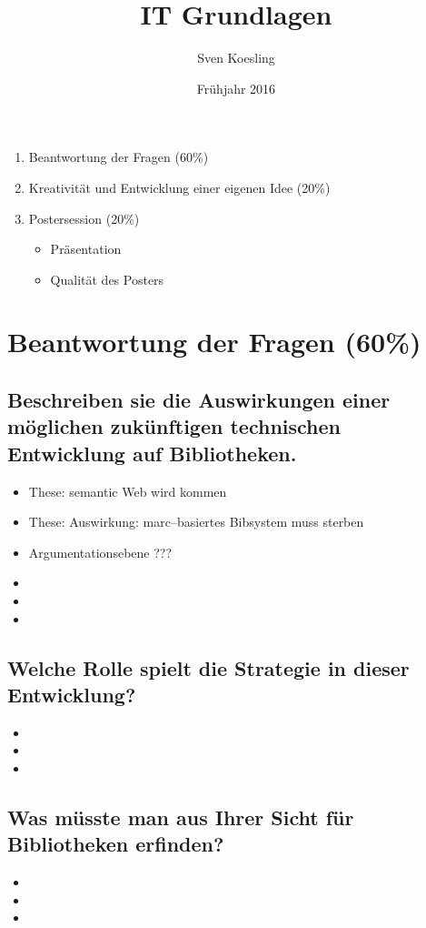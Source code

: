 \documentclass[german,headsepline]{scrartcl}
\title{IT Grundlagen}
\author{Sven Koesling}
\date{Frühjahr 2016}
\begin{document}
\begin{enumerate}
  \item Beantwortung der Fragen (60\%)
  \item Kreativität und Entwicklung einer eigenen Idee (20\%)
  \item Postersession (20\%)
  \begin{itemize}
    \item Präsentation
    \item Qualität des Posters
  \end{itemize}
\end{enumerate}
  
\section{Beantwortung der Fragen (60\%)}
\subsection{Beschreiben sie die Auswirkungen einer möglichen zukünftigen technischen Entwicklung auf Bibliotheken.}
\begin{itemize}
  \item These: semantic Web wird kommen
  \item These: Auswirkung: marc--basiertes Bibsystem muss sterben
  \item Argumentationsebene ???
  \item 
  \item
  \item
\end{itemize}

\subsection{Welche Rolle spielt die Strategie in dieser Entwicklung?}
\begin{itemize}
  \item 
  \item 
  \item
\end{itemize}

\subsection{Was müsste man aus Ihrer Sicht für Bibliotheken erfinden?}
\begin{itemize}
  \item 
  \item 
  \item
\end{itemize}
\end{document}
